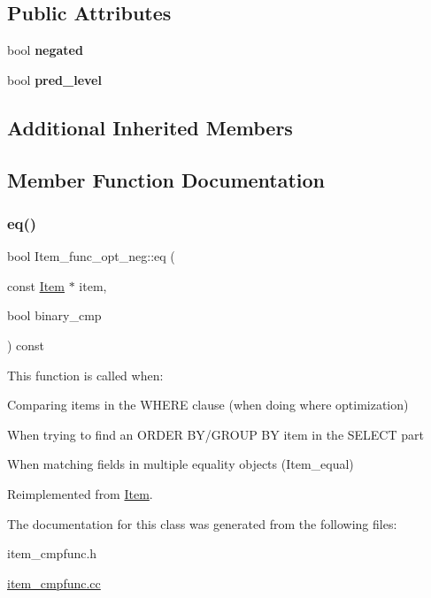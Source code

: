 \subsection*{Public Attributes}
\begin{DoxyCompactItemize}
\item 
\mbox{\label{classItem__func__opt__neg_afcae7821880931601b6a267dee599949}} 
bool {\bfseries negated}
\item 
\mbox{\label{classItem__func__opt__neg_a969430a12203ead51625ef75043df15c}} 
bool {\bfseries pred\+\_\+level}
\end{DoxyCompactItemize}
\subsection*{Additional Inherited Members}


\subsection{Member Function Documentation}
\mbox{\label{classItem__func__opt__neg_a7a637b1a83c5f2737350e3630318fa76}} 
\subsubsection{\texorpdfstring{eq()}{eq()}}
{\footnotesize\ttfamily bool Item\+\_\+func\+\_\+opt\+\_\+neg\+::eq (\begin{DoxyParamCaption}\item[{const \mbox{\hyperlink{classItem}{Item}} $\ast$}]{item,  }\item[{bool}]{binary\+\_\+cmp }\end{DoxyParamCaption}) const\hspace{0.3cm}{\ttfamily [virtual]}}

This function is called when\+:
\begin{DoxyItemize}
\item Comparing items in the W\+H\+E\+RE clause (when doing where optimization)
\item When trying to find an O\+R\+D\+ER B\+Y/\+G\+R\+O\+UP BY item in the S\+E\+L\+E\+CT part
\item When matching fields in multiple equality objects (Item\+\_\+equal) 
\end{DoxyItemize}

Reimplemented from \mbox{\hyperlink{classItem_af0957bbdb9a256de0cd29f1adcae28be}{Item}}.



The documentation for this class was generated from the following files\+:\begin{DoxyCompactItemize}
\item 
item\+\_\+cmpfunc.\+h\item 
\mbox{\hyperlink{item__cmpfunc_8cc}{item\+\_\+cmpfunc.\+cc}}\end{DoxyCompactItemize}
